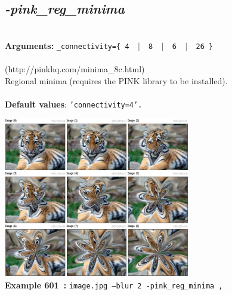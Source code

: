 \documentclass[a4paper,11pt,twoside]{book}
\begin{document}
\subsection{\emph{-pink\_reg\_minima} }\vspace*{-0.5em}
~\\\textbf{Arguments: } 
{\small \texttt{\_connectivity=\{ 4 ~$|$~ 8 ~$|$~ 6 ~$|$~ 26 \}}}\\~\\
(http://pinkhq.com/minima\_8c.html)
~\\Regional minima (requires the PINK library to be installed).
~\\~\\\textbf{Default values}: {\small \texttt{'connectivity=4'.}}
\begin{center}\includegraphics[keepaspectratio=true,height=7cm,width=\textwidth]{img/gmic_def601.jpg}\\
{\footnotesize \textbf{Example 601~:} \texttt{image.jpg --blur 2 -pink\_reg\_minima ,}}
\end{center}
\end{document}
